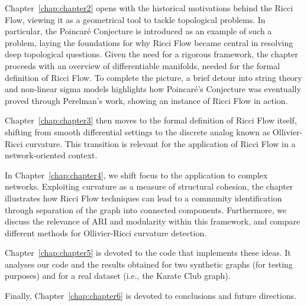 Chapter~\ref{chap:chapter2} opens with the historical motivations behind the Ricci Flow, viewing it as a geometrical tool to tackle topological problems. In particular, the Poincaré Conjecture is introduced as an example of such a problem, laying the foundations for why Ricci Flow became central in resolving deep topological questions. Given the need for a rigorous framework, the chapter proceeds with an overview of differentiable manifolds, needed for the formal definition of Ricci Flow. To complete the picture, a brief detour into string theory and non-linear sigma models highlights how Poincaré's Conjecture was eventually proved through Perelman's work, showing an instance of Ricci Flow in action.

Chapter~\ref{chap:chapter3} then moves to the formal definition of Ricci Flow itself, shifting from smooth differential settings to the discrete analog known as Ollivier-Ricci curvature. This transition is relevant for the application of Ricci Flow in a network-oriented context.

In Chapter~\ref{chap:chapter4}, we shift focus to the application to complex networks. Exploiting curvature as a measure of structural cohesion, the chapter illustrates how Ricci Flow techniques can lead to a community identification through separation of the graph into connected components. Furthermore, we discuss the relevance of ARI and modularity within this framework, and compare different methods for Ollivier-Ricci curvature detection.

Chapter~\ref{chap:chapter5} is devoted to the code that implements these ideas. It analyses our code and the results obtained for two synthetic graphs (for testing purposes) and for a real dataset (i.e., the Karate Club graph).

Finally, Chapter~\ref{chap:chapter6} is devoted to conclusions and future directions.